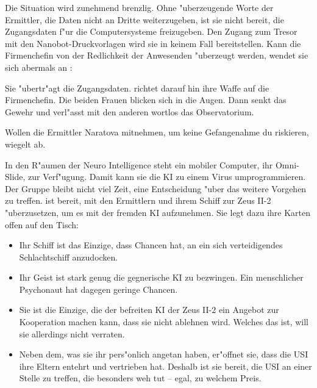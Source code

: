 Die Situation wird zunehmend brenzlig. Ohne "uberzeugende Worte der Ermittler, die Daten nicht an Dritte weiterzugeben, ist sie nicht bereit, die Zugangsdaten f"ur die Computersysteme freizugeben. Den Zugang zum Tresor mit den Nanobot-Druckvorlagen wird sie in keinem Fall bereitstellen. Kann die Firmenchefin von der Redlichkeit der Anwesenden "uberzeugt werden, wendet sie sich abermals an \ml{}:


Sie "ubertr"agt \ml{} die Zugangsdaten. \xl{} richtet darauf hin ihre Waffe auf die Firmenchefin. Die beiden Frauen blicken sich in die Augen. Dann senkt \xl{} das Gewehr und verl"asst mit den anderen wortlos das Observatorium.

Wollen die Ermittler Naratova mitnehmen, um keine Gefangenahme du riskieren, wiegelt \xl{} ab. 


In den R"aumen der Neuro Intelligence steht \ml{} ein mobiler Computer, ihr Omni-Slide, zur Verf"ugung. Damit kann sie die KI zu einem Virus umprogrammieren. Der Gruppe bleibt nicht viel Zeit, eine Entscheidung "uber das weitere Vorgehen zu treffen. \xl{} ist bereit, mit den Ermittlern und ihrem Schiff zur Zeus II-2 "uberzusetzen, um es mit der fremden KI aufzunehmen. Sie legt dazu ihre Karten offen auf den Tisch:

\begin{itemize}
	\item Ihr Schiff ist das Einzige, dass Chancen hat, an ein sich verteidigendes Schlachtschiff anzudocken.
	\item Ihr Geist ist stark genug die gegnerische KI zu bezwingen. Ein menschlicher Psychonaut hat dagegen geringe Chancen.
	\item Sie ist die Einzige, die der befreiten KI der Zeus II-2 ein Angebot zur Kooperation machen kann, dass sie nicht ablehnen wird. 
		Welches das ist, will sie allerdings nicht verraten.
    \item Neben dem, was sie ihr pers"onlich angetan haben, er"offnet sie, dass die USI ihre Eltern entehrt und vertrieben hat. Deshalb ist sie bereit, die USI an einer Stelle zu treffen, die besonders weh tut -- egal, zu welchem Preis.
\end{itemize}

